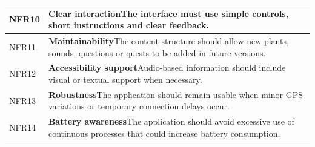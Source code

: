 \begin{longtable}{|l|p{}|}
\hline
NFR10 & \textbf{Clear interaction}\newline The interface must use simple controls, short instructions and clear feedback. \\
\hline
NFR11 & \textbf{Maintainability}\newline The content structure should allow new plants, sounds, questions or quests to be added in future versions. \\
\hline
NFR12 & \textbf{Accessibility support}\newline Audio-based information should include visual or textual support when necessary. \\
\hline
NFR13 & \textbf{Robustness}\newline The application should remain usable when minor GPS variations or temporary connection delays occur. \\
\hline
NFR14 & \textbf{Battery awareness}\newline The application should avoid excessive use of continuous processes that could increase battery consumption. \\
\hline

\end{longtable}
